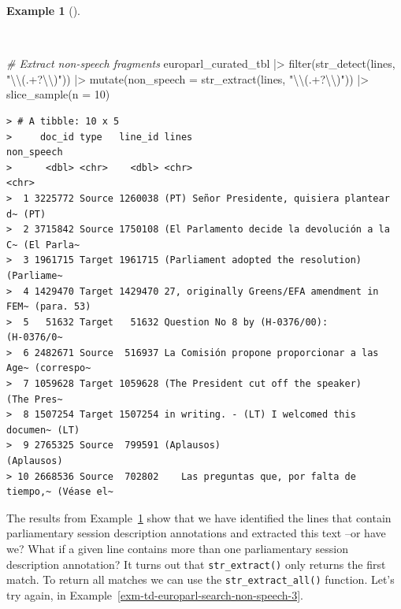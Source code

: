 \documentclass[
  letterpaper,
  DIV=11,
  numbers=noendperiod]{scrreport}
\newenvironment{Shaded}{\begin{snugshade}}{\end{snugshade}}
\newcommand{\AttributeTok}[1]{\textcolor[rgb]{0.00,0.00,0.00}{#1}}
\newcommand{\CommentTok}[1]{\textcolor[rgb]{0.00,0.00,0.00}{\textit{#1}}}
\newcommand{\DecValTok}[1]{\textcolor[rgb]{0.00,0.00,0.00}{#1}}
\newcommand{\FunctionTok}[1]{\textcolor[rgb]{0.00,0.00,0.00}{#1}}
\newcommand{\NormalTok}[1]{\textcolor[rgb]{0.00,0.00,0.00}{#1}}
\newcommand{\SpecialCharTok}[1]{\textcolor[rgb]{0.00,0.00,0.00}{#1}}
\newcommand{\StringTok}[1]{\textcolor[rgb]{0.00,0.00,0.00}{#1}}
\theoremstyle{definition}
\newtheorem{example}{Example}[chapter]
\theoremstyle{remark}
\begin{document}
\begin{example}[]\protect\hypertarget{exm-td-europarl-search-non-speech-2}{}\label{exm-td-europarl-search-non-speech-2}

~

\begin{Shaded}
\begin{Highlighting}[]
\CommentTok{\# Extract non{-}speech fragments}
\NormalTok{europarl\_curated\_tbl }\SpecialCharTok{|\textgreater{}}
  \FunctionTok{filter}\NormalTok{(}\FunctionTok{str\_detect}\NormalTok{(lines, }\StringTok{"}\SpecialCharTok{\textbackslash{}\textbackslash{}}\StringTok{(.+?}\SpecialCharTok{\textbackslash{}\textbackslash{}}\StringTok{)"}\NormalTok{)) }\SpecialCharTok{|\textgreater{}}
  \FunctionTok{mutate}\NormalTok{(}\AttributeTok{non\_speech =} \FunctionTok{str\_extract}\NormalTok{(lines, }\StringTok{"}\SpecialCharTok{\textbackslash{}\textbackslash{}}\StringTok{(.+?}\SpecialCharTok{\textbackslash{}\textbackslash{}}\StringTok{)"}\NormalTok{)) }\SpecialCharTok{|\textgreater{}}
  \FunctionTok{slice\_sample}\NormalTok{(}\AttributeTok{n =} \DecValTok{10}\NormalTok{) }
\end{Highlighting}
\end{Shaded}

\begin{verbatim}
> # A tibble: 10 x 5
>     doc_id type   line_id lines                                       non_speech
>      <dbl> <chr>    <dbl> <chr>                                       <chr>     
>  1 3225772 Source 1260038 (PT) Señor Presidente, quisiera plantear d~ (PT)      
>  2 3715842 Source 1750108 (El Parlamento decide la devolución a la C~ (El Parla~
>  3 1961715 Target 1961715 (Parliament adopted the resolution)         (Parliame~
>  4 1429470 Target 1429470 27, originally Greens/EFA amendment in FEM~ (para. 53)
>  5   51632 Target   51632 Question No 8 by (H-0376/00):               (H-0376/0~
>  6 2482671 Source  516937 La Comisión propone proporcionar a las Age~ (correspo~
>  7 1059628 Target 1059628 (The President cut off the speaker)         (The Pres~
>  8 1507254 Target 1507254 in writing. - (LT) I welcomed this documen~ (LT)      
>  9 2765325 Source  799591 (Aplausos)                                  (Aplausos)
> 10 2668536 Source  702802    Las preguntas que, por falta de tiempo,~ (Véase el~
\end{verbatim}

\end{example}

The results from Example~\ref{exm-td-europarl-search-non-speech-2} show
that we have identified the lines that contain parliamentary session
description annotations and extracted this text --or have we? What if a
given line contains more than one parliamentary session description
annotation? It turns out that \texttt{str\_extract()} only returns the
first match. To return all matches we can use the
\texttt{str\_extract\_all()} function. Let's try again, in
Example~\ref{exm-td-europarl-search-non-speech-3}.
\end{document}
